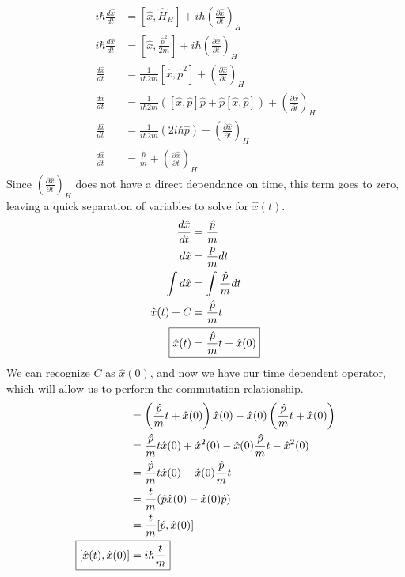 \documentclass{jhwhw}
\begin{document}
\begin{align}
	i \hbar \frac{d \hat{x}}{dt} &= [\hat{x}, \hat{H}_H] + i \hbar \left( \frac{
	\partial \hat{x}}{\partial t} \right)_H \\
	i \hbar \frac{d \hat{x}}{dt} &= [\hat{x}, \frac{\hat{p}^2}{2m}] + i \hbar \left( \frac{
	\partial \hat{x}}{\partial t} \right)_H \\
	\frac{d \hat{x}}{dt} &= \frac{1}{i \hbar 2 m }[\hat{x}, \hat{p}^2] + \left( \frac{
	\partial \hat{x}}{\partial t} \right)_H \\
	\frac{d \hat{x}}{dt} &= \frac{1}{i \hbar 2 m }\left([\hat{x}, \hat{p}]\hat{p} + \hat{p}[\hat{x}, \hat{p}] \right) + \left( \frac{
	\partial \hat{x}}{\partial \hat{t}} \right)_H \\
	\frac{d \hat{x}}{dt} &= \frac{1}{i \hbar 2 m }\left(2 i \hbar \hat{p} \right) + \left( \frac{
	\partial \hat{x}}{\partial t} \right)_H \\
	\frac{d \hat{x}}{dt} &= \frac{\hat{p}}{m } + \left( \frac{
	\partial \hat{x}}{\partial t} \right)_H
\end{align}
Since $\left( \frac{\partial \hat{x}}{\partial t} \right)_H$ does not have a direct dependance on time, this term goes to zero, leaving a quick separation of variables to solve for $\hat{x}(t)$.
\begin{align}
	\frac{d \hat{x}}{dt} 
	&= 
	\frac{\hat{p}}{m} \\
	d \hat{x}
	&=
	\frac{p}{m}dt \\
	\int d \hat{x}
	&=
	\int\frac{\hat{p}}{m}dt \\
	\hat{x}(t) + C
	&=
	\frac{\hat{p}}{m}t \\
	\Aboxed{
	\hat{x}(t)
	&=
	\frac{\hat{p}}{m}t + \hat{x}(0) }
\end{align}
We can recognize $C$ as $\hat{x}(0)$, and now we have our time dependent operator, which will allow us to perform the commutation relationship.  
\begin{align}
	[\hat{x}(t),\hat{x}(0)] 
	&=
	\left(\frac{\hat{p}}{m}t + \hat{x}(0)\right)\hat{x}(0)
	-
	\hat{x}(0)\left(\frac{\hat{p}}{m}t + \hat{x}(0)\right)
	\\
	&=
	\frac{\hat{p}}{m}t\hat{x}(0) + \hat{x}^2(0)
	-
	\hat{x}(0)\frac{\hat{p}}{m}t - \hat{x}^2(0)
	\\
	&=
	\frac{\hat{p}}{m}t\hat{x}(0)
	-
	\hat{x}(0)\frac{\hat{p}}{m}t
	\\
	&=
	\frac{t}{m}
	(\hat{p}\hat{x}(0)
	-
	\hat{x}(0)\hat{p})
	\\
	&=
	\frac{t}{m}
	[\hat{p},\hat{x}(0)]
	\\
	\Aboxed{
	[\hat{x}(t),\hat{x}(0)] 
	&=i \hbar\frac{t}{m}
	}
\end{align}
\end{document}
